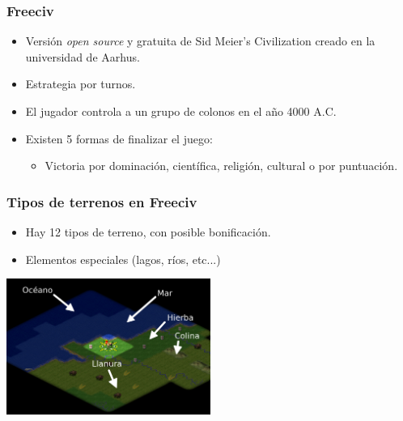\begin{frame}
	\frametitle{Freeciv}

	\begin{itemize}
		\item<1-> Versión \textcolor{UDCpink}{\textit{open source}} y \textcolor{UDCpink}{gratuita} de Sid Meier's Civilization creado en la universidad de Aarhus.
		
		\vspace{1em}
		
		\item<2-> Estrategia por turnos.
		
		\vspace{1em}
		
		\item<3-> El jugador controla a un grupo de colonos en el año 4000 A.C.
		
		\vspace{1em}
		
		\item<4-> Existen 5 formas de finalizar el juego:
		
		\vspace{0.5em}
		
		\begin{itemize}
			\item Victoria por dominación, científica, religión, cultural o por puntuación.
		\end{itemize}
	\end{itemize}
\end{frame}

\begin{frame}
\frametitle{Tipos de terrenos en Freeciv}

\begin{itemize}
	\item<1-> Hay \textcolor{UDCpink}{12 tipos de terreno}, con posible bonificación.
	
	\vspace{1em}
	
	\item<2-> Elementos especiales (lagos, ríos, etc...)
\end{itemize}

\vspace{1em}

\pause[3]

\centering
\includegraphics[width=0.5\textwidth]{images/freeciv-example.png}
\end{frame}


